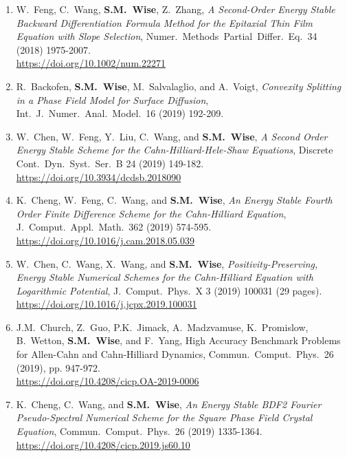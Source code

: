 \documentclass[11pt]{letter}
\begin{document}
\begin{enumerate}
	\item
W.~Feng, C.~Wang, \textbf{S.M.~Wise},  Z.~Zhang, {\sl A Second-Order Energy Stable Backward Differentiation Formula Method for the Epitaxial Thin Film Equation with Slope Selection}, Numer.~Methods~Partial~Differ.~Eq.~34 (2018) 1975-2007.
	\\ 
\url{https://doi.org/10.1002/num.22271}

	\item
R.~Backofen, \textbf{S.M.~Wise}, M.~Salvalaglio, and A.~Voigt, {\sl Convexity Splitting in a Phase Field Model for Surface Diffusion}, Int.~J.~Numer.~Anal.~Model.~16 (2019) 192-209.

	\item
W.~Chen, W.~Feng, Y.~Liu, C.~Wang, and \textbf{S.M.~Wise}, {\sl A Second Order Energy Stable Scheme for the Cahn-Hilliard-Hele-Shaw Equations}, Discrete Cont.~Dyn.~Syst.~Ser.~B 24 (2019) 149-182.
	\\ 
\url{https://doi.org/10.3934/dcdsb.2018090}

		\item
K.~Cheng, W.~Feng, C.~Wang, and \textbf{S.M.~Wise}, {\sl An Energy Stable Fourth Order Finite Difference Scheme for the Cahn-Hilliard Equation}, J.~Comput.~Appl.~Math.~362 (2019) 574-595.
	\\ 
\url{https://doi.org/10.1016/j.cam.2018.05.039}

    \item
W.~Chen, C.~Wang, X.~Wang, and \textbf{S.M.~Wise}, {\sl Positivity-Preserving, Energy Stable Numerical Schemes for the Cahn-Hilliard Equation with Logarithmic Potential}, J.~Comput.~Phys.~X 3 (2019) 100031 (29 pages).
	\\ 
\url{https://doi.org/10.1016/j.jcpx.2019.100031}

	\item
J.M.~Church, Z.~Guo, P.K.~Jimack, A.~Madzvamuse, K.~Promislow, B.~Wetton, \textbf{S.M.~Wise}, and F.~Yang, {High Accuracy Benchmark Problems for Allen-Cahn and Cahn-Hilliard Dynamics},  Commun.~Comput.~Phys.~26 (2019), pp. 947-972.
	\\ 
\url{https://doi.org/10.4208/cicp.OA-2019-0006}

	\item
K.~Cheng, C.~Wang, and \textbf{S.M.~Wise}, {\sl An Energy Stable BDF2 Fourier Pseudo-Spectral Numerical Scheme for the Square Phase Field Crystal Equation}, Commun.~Comput.~Phys.~26 (2019) 1335-1364.
	\\ 
\url{https://doi.org/10.4208/cicp.2019.js60.10}


\end{enumerate}
\end{document}
